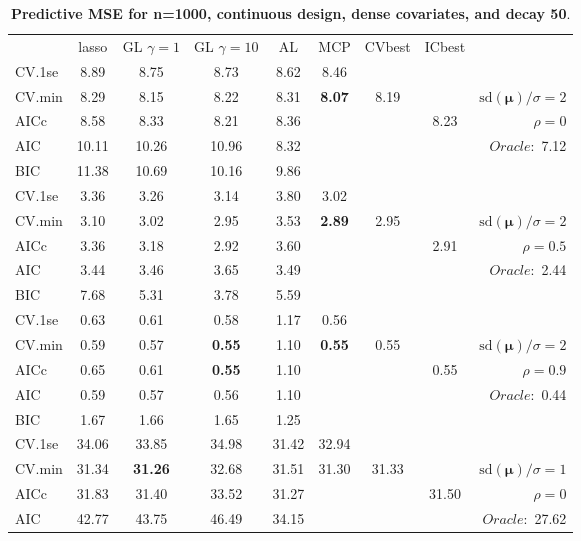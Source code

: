 \clearpage
\begin{table}\vspace{-.5cm}
\caption[l]{ { \bf Predictive MSE for n=1000, continuous design, 
dense covariates, and  decay  50}.}
\vspace{-.5cm}
\footnotesize{}
\begin{center}
\begin{tabular}{l*{7}{c}|r}
 & lasso & GL $\gamma=1$ & GL $\gamma=10$ & AL & MCP  & CVbest & ICbest  \\
\cline{1-9}
CV.1se & 8.89 & 8.75 & 8.73 & 8.62 & 8.46 & & & \\
CV.min & 8.29 & 8.15 & 8.22 & 8.31 & {\bf 8.07} & 8.19 & & $\mathrm{sd}(\mathbf{\mu})/\sigma=2$ \\
AICc & 8.58 & 8.33 & 8.21 & 8.36 & & & 8.23 &  $\rho=0$ \\
AIC & 10.11 & 10.26 & 10.96 & 8.32 & & & &  \multirow{2}{*}{$Oracle: $ 7.12} \\
BIC & 11.38 & 10.69 & 10.16 & 9.86 & & & &  \\
 \hline 
CV.1se & 3.36 & 3.26 & 3.14 & 3.80 & 3.02 & & & \\
CV.min & 3.10 & 3.02 & 2.95 & 3.53 & {\bf 2.89} & 2.95 & & $\mathrm{sd}(\mathbf{\mu})/\sigma=2$ \\
AICc & 3.36 & 3.18 & 2.92 & 3.60 & & & 2.91 &  $\rho=0.5$ \\
AIC & 3.44 & 3.46 & 3.65 & 3.49 & & & &  \multirow{2}{*}{$Oracle: $ 2.44} \\
BIC & 7.68 & 5.31 & 3.78 & 5.59 & & & &  \\
 \hline 
CV.1se & 0.63 & 0.61 & 0.58 & 1.17 & 0.56 & & & \\
CV.min & 0.59 & 0.57 & {\bf 0.55} & 1.10 & {\bf 0.55} & 0.55 & & $\mathrm{sd}(\mathbf{\mu})/\sigma=2$ \\
AICc & 0.65 & 0.61 & {\bf 0.55} & 1.10 & & & 0.55 &  $\rho=0.9$ \\
AIC & 0.59 & 0.57 & 0.56 & 1.10 & & & &  \multirow{2}{*}{$Oracle: $ 0.44} \\
BIC & 1.67 & 1.66 & 1.65 & 1.25 & & & &  \\
 \hline 
CV.1se & 34.06 & 33.85 & 34.98 & 31.42 & 32.94 & & & \\
CV.min & 31.34 & {\bf 31.26} & 32.68 & 31.51 & 31.30 & 31.33 & & $\mathrm{sd}(\mathbf{\mu})/\sigma=1$ \\
AICc & 31.83 & 31.40 & 33.52 & 31.27 & & & 31.50 &  $\rho=0$ \\
AIC & 42.77 & 43.75 & 46.49 & 34.15 & & & &  \multirow{2}{*}{$Oracle: $ 27.62} \\

\end{tabular}
\end{center}
\end{table}
